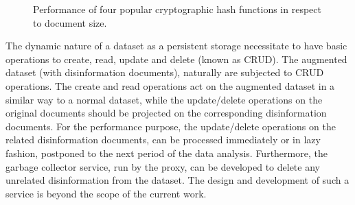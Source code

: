 \begin{figure}[H]
\centering
\resizebox{0.6\textwidth}{!}{}
\caption{Performance of four popular cryptographic hash functions in respect to document size.}
\label{fig:hashPerformance}
\end{figure}


The dynamic nature of a dataset as a persistent storage necessitate to have basic operations to create, read, update and delete (known as CRUD). The augmented dataset (with disinformation documents), naturally are subjected to CRUD operations. The create and read operations act on the augmented dataset in a similar way to a normal dataset, while the update/delete operations on the original documents should be projected on the corresponding disinformation documents. For the performance purpose, the update/delete operations on the related disinformation documents, can be processed immediately or in lazy fashion, postponed to the next period of the data analysis. Furthermore, the garbage collector service, run by the proxy, can be developed to delete any unrelated disinformation from the dataset. The design and development of such a service is beyond the scope of the current work. 

